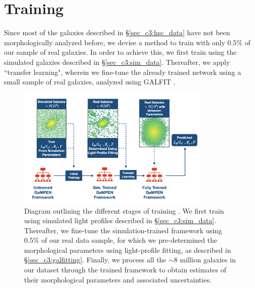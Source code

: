 \section{Training \gampen{}} \label{sec_c3:method}
 
Since most of the galaxies described in \S \ref{sec_c3:hsc_data} have not been morphologically analyzed before, we devise a method to train \gampen{} with only $0.5\%$ of our sample of real galaxies. In order to achieve this, we first train \gampen{} using the simulated galaxies described in \S \ref{sec_c3:sim_data}. Thereafter, we apply ``transfer learning", wherein we fine-tune the already trained network using a small sample of real galaxies, analyzed using GALFIT \citep{galfit}. 

\begin{figure}[htb]
    \centering
    \includegraphics[width
    =0.83\textwidth]{full_gampen_workflow.png}
    \caption{Diagram outlining the different stages of training \gampen{}. We first train \gampen{} using simulated light profiles described in \S \ref{sec_c3:sim_data}. Thereafter, we fine-tune the simulation-trained framework using $0.5\%$ of our real data sample, for which we pre-determined the morphological parameters using light-profile fitting, as described in \S \ref{sec_c3:galfitting}. Finally, we process all the $\sim 8$ million galaxies in our dataset through the trained \gampen{} framework to obtain estimates of their morphological parameters and associated uncertainties.}
    \label{fig_c3:full_gampen_workflow}
\end{figure}

